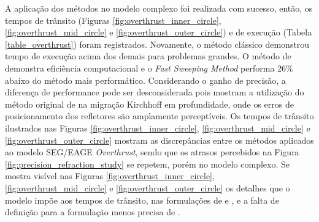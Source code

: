 A aplicação dos métodos no modelo complexo foi realizada com sucesso, então, os tempos de trânsito (Figuras \ref{fig:overthrust_inner_circle}, \ref{fig:overthrust_mid_circle} e \ref{fig:overthrust_outer_circle}) e de execução (Tabela \ref{table_overthrust}) foram registrados. Novamente, o método clássico demonstrou tempo de execução acima dos demais para problemas grandes. O método de  demonstra eficiência computacional e o \textit{Fast Sweeping Method} performa 26$\%$ abaixo do método mais performático. Considerando o ganho de precisão, a diferença de performance pode ser desconsiderada pois  mostram a utilização do método original de  na migração Kirchhoff em profundidade, onde os erros de posicionamento dos refletores são amplamente perceptíveis. Os tempos de trânsito ilustrados nas Figuras \ref{fig:overthrust_inner_circle}, \ref{fig:overthrust_mid_circle} e \ref{fig:overthrust_outer_circle} mostram as discrepâncias entre os métodos aplicados ao modelo SEG/EAGE \textit{Overthrust}, sendo que os atrasos percebidos na Figura \ref{fig:precision_refraction_study} se repetem, porém no modelo complexo. Se mostra visível nas Figuras \ref{fig:overthrust_inner_circle}, \ref{fig:overthrust_mid_circle} e \ref{fig:overthrust_outer_circle} os detalhes que o modelo impõe aos tempos de trânsito, nas formulações de  e , e a falta de definição para a formulação menos precisa de .  





